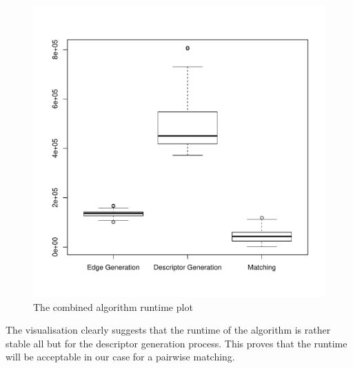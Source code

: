 \begin{figure}
  \includegraphics[width=\textwidth]{sketch/all.pdf}
  \caption{The combined algorithm runtime plot}
  \label{fig:algo_visual_all}
\end{figure}

The visualisation clearly suggests that the runtime of the algorithm is rather stable all but for the descriptor generation process. This proves that the runtime will be acceptable in our case for a pairwise matching.
